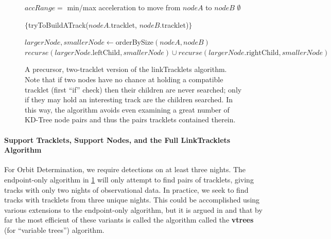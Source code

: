 \begin{figure}[ht!]
\begin{algorithmic}
  
  \STATE $accRange = $ min/max acceleration to move from $nodeA$ to $nodeB$
  \RETURN $\emptyset$
  \ELSE
  
  \STATE {}
    
    \RETURN $\{$tryToBuildATrack($nodeA$.tracklet, $nodeB$.tracklet)$\}$
    \ELSE
    
    \STATE {}
    
    \STATE $largerNode, smallerNode \gets $orderBySize$(nodeA, nodeB)$
    \RETURN $recurse(largerNode.\text{leftChild}, smallerNode) \cup recurse(largerNode.\text{rightChild}, smallerNode)$
    \ENDIF
    \ENDIF
    
  \end{algorithmic}
  \caption{A precursor, two-tracklet version of the linkTracklets
    algorithm.  Note that if two nodes have no chance at holding a
    compatible tracklet (first ``if'' check) then their children are
    never searched; only if they may hold an interesting track are the
    children searched.  In this way, the algorithm avoids even
    examining a great number of KD-Tree node pairs and thus the pairs
    tracklets contained therein.}
  
  \label{simplifiedLinkTracklets}
\end{figure}

\paragraph{Support Tracklets, Support Nodes, and the Full LinkTracklets Algorithm}

For Orbit Determination, we require detections on at least three
nights.  The endpoint-only algorithm in \ref{simplifiedLinkTracklets}
will only attempt to find pairs of tracklets, giving tracks with only
two nights of observational data.  In practice, we seek to find tracks
with tracklets from three unique nights.  This could be accomplished
using various extensions to the endpoint-only algorithm, but it is
argued in \citet{kubica_thesis} and
\citet{Kubica:2005:MTA:1081870.1081889} that by far the most efficient
of these variants is called the algorithm called the {\bf vtrees} (for
``variable trees'') algorithm.

